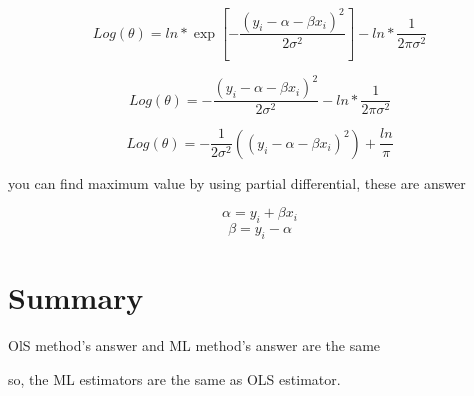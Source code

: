 \documentclass[dvipdfmx]{jsarticle}
\begin{document}
\begin{equation}
  Log(θ)= ln*\exp[-\dfrac{(y_i - α - βx_i)^2}{2\sigma^ 2}] - ln*\dfrac{1}{2π\sigma^ 2}
\end{equation}

\begin{equation}
  Log(θ)= -\dfrac{(y_i - α - βx_i)^2}{2\sigma^ 2} - ln*\dfrac{1}{2π\sigma^ 2}
\end{equation}

\begin{equation}
  Log(θ)= -\dfrac{1}{2\sigma^2}{((y_i - α - βx_i)^2) + \dfrac{ln}{π}}
\end{equation}

you can find maximum value by using partial differential, these are answer

\begin{equation}
  α = y_i + βx_i
\end{equation}
\begin{equation}
  β = y_i - α
\end{equation}




\section{Summary}

OlS method's answer and ML method's answer are the same

so, the ML estimators are the same as OLS estimator.
\end{document}
